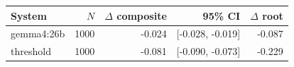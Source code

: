 \begin{tabular}{lrrrr}
\toprule
System & $N$ & $\Delta$ composite & 95\% CI & $\Delta$ root \\
\midrule
gemma4:26b & 1000 & -0.024 & [-0.028, -0.019] & -0.087 \\
threshold & 1000 & -0.081 & [-0.090, -0.073] & -0.229 \\
\bottomrule
\end{tabular}

